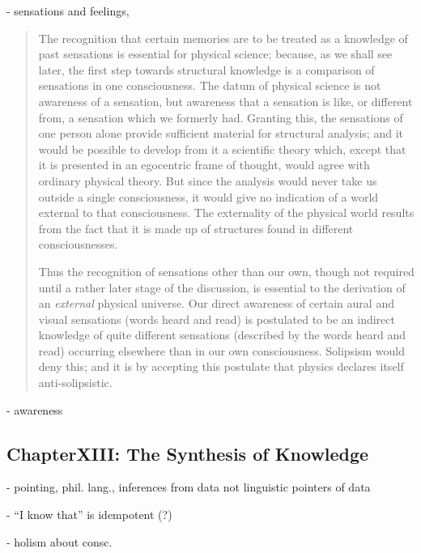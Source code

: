 - sensations and feelings, 

\begin{quote}
    The recognition that certain memories are to be treated as a knowledge of past sensations is essential for physical science; because, as we shall see later, the first step towards structural knowledge is a comparison of sensations in one consciousness.  The datum of physical science is not awareness of a sensation, but awareness that a sensation is like, or different from, a sensation which we formerly had.  Granting this, the sensations of one person alone provide sufficient material for structural analysis; and it would be possible to develop from it a scientific theory which, except that it is presented in an egocentric frame of thought, would agree with ordinary physical theory.  But since the analysis would never take us outside a single consciousness, it would give no indication of a world external to that consciousness.  The externality of the physical world results from the fact that it is made up of structures found in different consciousnesses.
    
    Thus the recognition of sensations other than our own, though not required until a rather later stage of the discussion, is essential to the derivation of an \emph{external} physical universe.  Our direct awareness of certain aural and visual sensations (words heard and read) is postulated to be an indirect knowledge of quite different sensations (described by the words heard and read) occurring elsewhere than in our own consciousness.  Solipsism would deny this; and it is by accepting this postulate that physics declares itself anti-solipsistic.  \citep[p. 198-199]{Eddington1939}
\end{quote}


- awareness

\subsection{ChapterXIII: The Synthesis of Knowledge}

- pointing, phil. lang., inferences from data not linguistic pointers of data

- ``I know that'' is idempotent (?)

- holism about consc.

